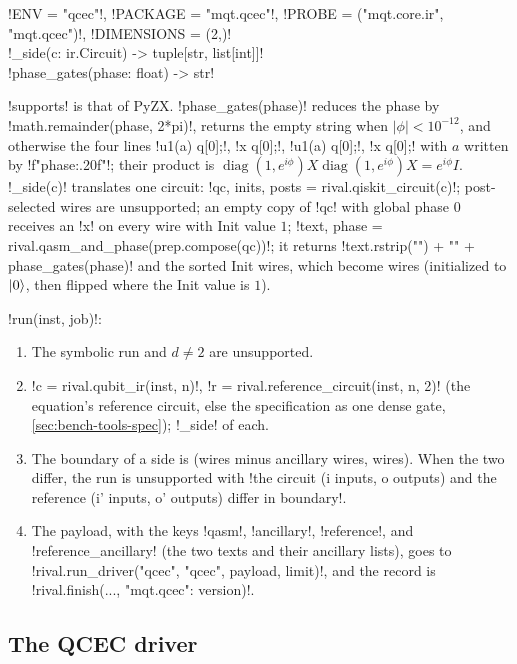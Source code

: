 \begin{signature}
\py!ENV = "qcec"!, \py!PACKAGE = "mqt.qcec"!, \py!PROBE = ("mqt.core.ir", "mqt.qcec")!, \py!DIMENSIONS = (2,)!\\
\py!_side(c: ir.Circuit) -> tuple[str, list[int]]!\\
\py!phase_gates(phase: float) -> str!
\end{signature}

\py!supports! is that of PyZX. \py!phase_gates(phase)! reduces the phase by \py!math.remainder(phase, 2*pi)!, returns the empty string when $|\phi|<10^{-12}$, and otherwise the four lines \code!u1(a) q[0];!, \code!x q[0];!, \code!u1(a) q[0];!, \code!x q[0];! with $a$ written by \code!f"{phase:.20f}"!; their product is $\operatorname{diag}(1,e^{i\phi})X\operatorname{diag}(1,e^{i\phi})X=e^{i\phi}I$. \py!_side(c)! translates one circuit: \py!qc, inits, posts = rival.qiskit_circuit(c)!; post-selected wires are unsupported; an empty copy of \py!qc! with global phase $0$ receives an \code!x! on every wire with Init value $1$; \py!text, phase = rival.qasm_and_phase(prep.compose(qc))!; it returns \py!text.rstrip("\n") + "\n" + phase_gates(phase)! and the sorted Init wires, which become  wires (initialized to $\lvert 0 \rangle$, then flipped where the Init value is $1$).

\py!run(inst, job)!:
\begin{enumerate}
\item The symbolic run and $d\neq2$ are unsupported.
\item \py!c = rival.qubit_ir(inst, n)!, \py!r = rival.reference_circuit(inst, n, 2)! (the equation's reference circuit, else the specification as one dense gate, \cref{sec:bench-tools-spec}); \py!_side! of each.
\item The boundary of a side is (wires minus ancillary wires, wires). When the two differ, the run is unsupported with \code!the circuit (i inputs, o outputs) and the reference (i' inputs, o' outputs) differ in boundary!.
\item The payload, with the keys \code!qasm!, \code!ancillary!, \code!reference!, and \code!reference_ancillary! (the two texts and their ancillary lists), goes to \py!rival.run_driver("qcec", "qcec", payload, limit)!, and the record is \py!rival.finish(..., {"mqt.qcec": version})!.
\end{enumerate}

\subsection{The QCEC driver}

